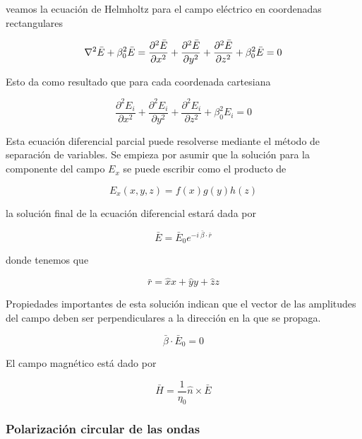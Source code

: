 veamos la ecuación de Helmholtz para el campo eléctrico en coordenadas rectangulares

\begin{equation*}
\nabla^2 \bar{E} + \beta_0^2 \Bar{E} = \frac{\partial^2 \Bar{E}}{\partial x^2} + \frac{\partial^2 \Bar{E}}{\partial y^2} + \frac{\partial^2 \Bar{E}}{\partial z^2} + \beta_0^2 \Bar{E} = 0
\end{equation*}

Esto da como resultado que para cada coordenada cartesiana

\begin{equation*}
 \frac{\partial^2 E_i}{\partial x^2} + \frac{\partial^2 E_i}{\partial y^2} + \frac{\partial^2 E_i}{\partial z^2} + \beta_0^2 E_i = 0
\end{equation*}

Esta ecuación diferencial parcial puede resolverse mediante el método de separación de variables. Se empieza por asumir que la solución para la componente del campo $E_x$ se puede escribir como el producto de

\begin{equation*}
E_x(x,y,z) = f(x)g(y)h(z)
\end{equation*}

la solución final de la ecuación diferencial estará dada por 

\begin{equation*}
\bar{E} = \bar{E}_0 e^{- i \ \bar{\beta} \cdot \bar{r}}
\end{equation*}

donde tenemos que 

\begin{equation*}
\bar{r} = \hat{x} x + \hat{y} y + \hat{z} z
\end{equation*}

Propiedades importantes de esta solución indican que el vector de las amplitudes del campo deben ser perpendiculares a la dirección en la que se propaga. 

\begin{equation*}
\bar{\beta} \cdot \bar{E}_0 = 0
\end{equation*}


El campo magnético está dado por

\begin{equation*}
\bar{H} = \frac{1}{\eta_0} \hat{n} \times \bar{E}
\end{equation*}

\subsubsection*{Polarización circular de las ondas}

